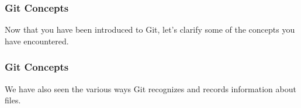 
\begin{frame}[t]\frametitle{Git Concepts}
	Now that you have been introduced to Git, let's clarify
	some of the concepts you have encountered.

	\begin{figure}[h!]
	    \label{states}\vspace{0.2cm}
    \end{figure}
\end{frame}

\begin{frame}[t]\frametitle{Git Concepts}
	We have also seen the various ways Git recognizes and
	records information about files.

	\begin{figure}[h!]
	    \label{file-states}\vspace{0.2cm}
    \end{figure}
\end{frame}

